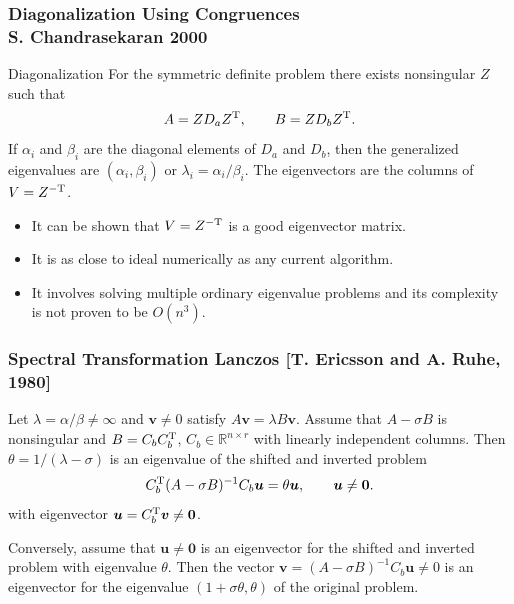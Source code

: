 \documentclass[landscape]{beamer}
\renewcommand{\vec}[1]{\bm{#1}}
\newcommand{\T}{{\rm T}}
\newcommand{\comm}[1]{\added[comment={#1}]{}}
\begin{document}
\begin{frame}
  \frametitle{Diagonalization Using Congruences \\
  S. Chandrasekaran 2000\comm{remove}}

\begin{block}{Diagonalization}
  For the symmetric definite problem there exists nonsingular $Z$ such that
  \begin{equation*}
    A = Z D_a Z^\T, \qquad B = Z D_b Z^\T.
  \end{equation*}
  If $\alpha_i$ and $\beta_i$ are the diagonal elements of $D_a$ and
  $D_b$, then the generalized eigenvalues are $(\alpha_i, \beta_i)$ or
  $\lambda_i = \alpha_i/ \beta_i$.  The eigenvectors are the columns
  of $V= Z^{-\T}$.
\end{block}

\begin{itemize}
\item It can be shown that $V=Z^{-\T}$ is a good eigenvector matrix.
\item It is as close to ideal numerically as any current algorithm.
\item It involves solving multiple ordinary eigenvalue problems and its
  complexity is not proven to be $O(n^3)$.
\end{itemize}
\end{frame}

\begin{frame}
  \frametitle{Spectral Transformation Lanczos
    [T. Ericsson and A. Ruhe, 1980]\comm{add a slide before this one describing the spectral transformation more generally for the standard eigenvalue problem and the nonsymmetric problem; you had that in your thesis and I think it is helpful here.}}

  \begin{lemma}
    \label{lm:spectral_transformation}
    Let $\lambda = \alpha/\beta \neq \infty$ and $\vec{v}\neq 0$ satisfy
    $A\vec{v} = \lambda B \vec{v}$.  Assume that $A-\sigma B$ is nonsingular and
    $B = C_b C_b^\T$, $C_b \in \mathbb{R}^{n \times r}$ with linearly independent
    columns.  Then $\theta = 1/(\lambda-\sigma)$ is an eigenvalue of
    the shifted and inverted problem
    \begin{equation*}
      C_b^\T (A-\sigma B)^{-1} C_b \vec{u} = \theta \vec{u}, \qquad \vec{u}\neq \vec{0}.
    \end{equation*}
    with eigenvector $\vec{u} = C_b^\T \vec{v}\neq \vec{0}$.

    Conversely, assume that $\vec{u}\neq \vec{0}$ is an eigenvector
    for the shifted and inverted problem with eigenvalue $\theta$.
    Then the vector $\vec{v} = (A - \sigma B)^{-1} C_b \vec{u}\neq 0$
    is an eigenvector for the eigenvalue $(1 + \sigma \theta, \theta)$
    of the original problem.
  \end{lemma}
\end{frame}
\end{document}
